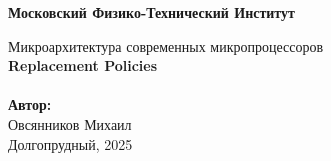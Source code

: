 \newcommand{\HRule}{\rule{\linewidth}{0.7mm}}

\begin{center}
	\large\textbf{Московский Физико-Технический Институт}\\
	\vfill
		
	\Large Микроархитектура современных микропроцессоров
	\\[0.4cm]
	{ \huge \bfseries Replacement Policies}
	\\[0.4cm]
	
	\ \\
	\textbf{\large Автор:} \\	
	\large Овсянников Михаил\\
	\vfill
	\large Долгопрудный, 2025
\end{center}

\thispagestyle{empty}

\newpage
\setcounter{page}{2}

